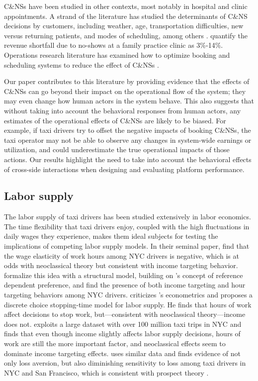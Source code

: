 \documentclass[reviewmode]{AEA}
\begin{document}
C\&NSs have been studied in other contexts, most notably in hospital and clinic appointments. A strand of the literature has studied the determinants of C\&NS decisions by customers, including weather, age, transportation difficulties, new versus returning patients, and modes of scheduling, among others \citep{norris2014empirical}. \citet{moore2001time} quantify the revenue shortfall due to no-shows at a family practice clinic as 3\%-14\%. Operations research literature has examined how to optimize booking and scheduling systems to reduce the effect of C\&NSs \citep{feldman2014appointment,patrick2008reducing}.

Our paper contributes to this literature by providing evidence that the effects of C\&NSs can go beyond their impact on the operational flow of the system; they may even change how human actors in the system behave. This also suggests that without taking into account the behavioral responses from human actors, any estimates of the operational effects of C\&NSs are likely to be biased. For example, if taxi drivers try to offset the negative impacts of booking C\&NSs, the taxi operator may not be able to observe any changes in system-wide earnings or utilization, and could underestimate the true operational impacts of those actions. Our results highlight the need to take into account the behavioral effects of cross-side interactions when designing and evaluating platform performance.


\subsection{Labor supply}
The labor supply of taxi drivers has been studied extensively in labor economics. The time flexibility that taxi drivers enjoy, coupled with the high fluctuations in daily wages they experience, makes them ideal subjects for testing the implications of competing labor supply models. In their seminal paper, \citet{camerer1997labor} find that the wage elasticity of work hours among NYC drivers is negative, which is at odds with neoclassical theory but consistent with income targeting behavior. \citet{crawford2011new} formalize this idea with a structural model, building on \citeauthor{kHoszegi2006model}'s \citeyear{kHoszegi2006model} concept of reference dependent preference, and find the presence of both income targeting and hour targeting behaviors among NYC drivers. \citet{farber2005tomorrow} criticizes \citeauthor{camerer1997labor}'s econometrics and proposes a discrete choice stopping-time model for labor supply. He finds that hours of work affect decisions to stop work, but---consistent with neoclassical theory---income does not. \citet{farber2015you} exploits a large dataset with over 100 million taxi trips in NYC and finds that even though income slightly affects labor supply decisions, hours of work are still the more important factor, and neoclassical effects seem to dominate income targeting effects. \citet{martin2017quit} uses similar data and finds evidence of not only loss aversion, but also diminishing sensitivity to loss among taxi drivers in NYC and San Francisco, which is consistent with prospect theory \citep{kahneman1979prospect}. 
\end{document}
